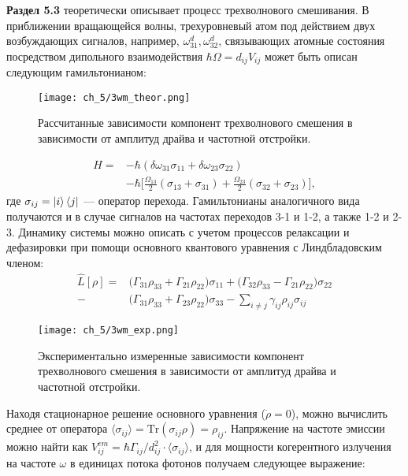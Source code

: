 \textbf{Раздел 5.3} теоретически описывает процесс трехволнового смешивания. В приближении вращающейся волны, трехуровневый атом под действием двух возбуждающих сигналов, например, $\omega^d_{31}, \omega^d_{32} $, связывающих атомные состояния посредством дипольного взаимодействия $\hbar\Omega = d_{ij}V_{ij}$ может быть описан следующим гамильтонианом:
\begin{figure}[htb]\center
	\texttt{[image: ch\_5/3wm\_theor.png]}
	\caption{Рассчитанные зависимости компонент трехволнового смешения в зависимости от амплитуд драйва и частотной отстройки.}
	\label{fig: 3wm_theor}	
\end{figure}
\begin{equation}
\begin{split}
H = & -\hbar (\delta\omega_{31}\sigma_{11} + \delta\omega_{23}\sigma_{22}) \\
    & -\hbar\Big[\frac{\Omega_{13}}{2}(\sigma_{13}+\sigma_{31})+\frac{\Omega_{23}}{2}(\sigma_{32}+\sigma_{23})\Big],
\end{split}
\end{equation}
где $\sigma_{ij} = \ket{i}\bra{j}$ --- оператор перехода. Гамильтонианы аналогичного вида получаются и в случае сигналов на частотах переходов 3-1 и 1-2, а также 1-2 и 2-3. Динамику системы можно описать с учетом процессов релаксации и дефазировки при помощи основного квантового уравнения с Линдбладовским членом:
\begin{equation}
\begin{split}
\hat{L}[\rho] = & \big(\Gamma_{31}\rho_{33} + \Gamma_{21}\rho_{22}\big)\sigma_{11} 
+ \big(\Gamma_{32}\rho_{33} - \Gamma_{21}\rho_{22}\big)\sigma_{22} \\
- &\big(\Gamma_{31}\rho_{33} + \Gamma_{23}\rho_{22}\big)\sigma_{33} 
- \sum_{i\ne j}\gamma_{ij}\rho_{ij}\sigma_{ij}
\end{split}
\end{equation}

\begin{figure}[h]\center
	\texttt{[image: ch\_5/3wm\_exp.png]}
	\caption{Экспериментально измеренные зависимости компонент трехволнового смешения в зависимости от амплитуд драйва и частотной отстройки. }
	\label{fig: 3wm_exp}	
\end{figure}
Находя стационарное решение основного уравнения ($\dot{\rho}=0$), можно вычислить среднее от оператора $\langle\sigma_{ij}\rangle=\text{Tr}(\sigma_{ij}\rho)=\rho_{ij}$. Напряжение на частоте эмиссии можно найти как $V_{ij}^{em} = \hbar\Gamma_{ij}/d_{ij}^2 \cdot \langle\sigma_{ij}\rangle$, и для мощности когерентного излучения на частоте $\omega$ в единицах потока фотонов получаем следующее выражение:

